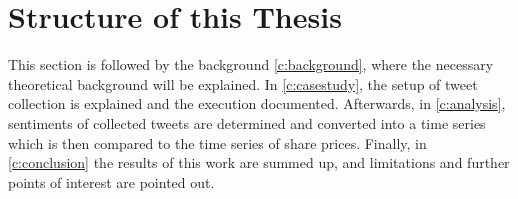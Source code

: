 \section{Structure of this Thesis}
\label{s:introduction-structureofthisthesis}

This section is followed by the background \cref{c:background}, where the necessary theoretical background will be explained. 
In \cref{c:casestudy}, the setup of tweet collection is explained and the execution documented.
Afterwards, in \cref{c:analysis}, sentiments of collected tweets are determined and converted into a time series which is then compared to the time series of share prices.
Finally, in \cref{c:conclusion} the results of this work are summed up, and limitations and further points of interest are pointed out.
